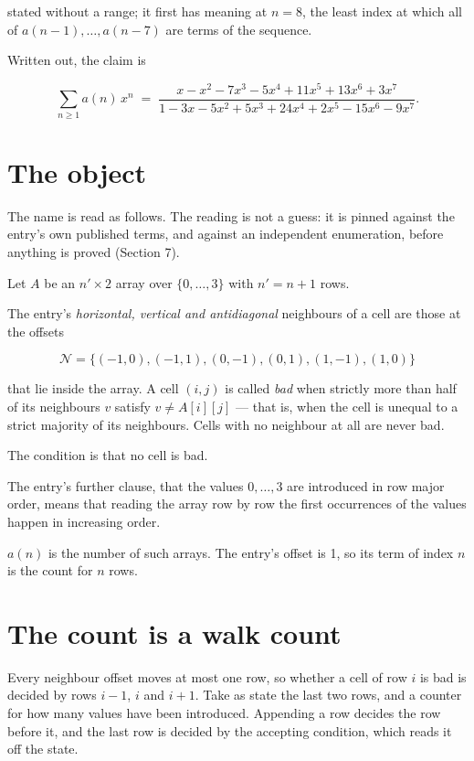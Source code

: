 \documentclass[11pt]{article}
\theoremstyle{definition}
\begin{document}
stated without a range; it first has meaning at $n = 8$, the least index at which all of $a(n-1),\dots,a(n-7)$ are terms of the sequence.

Written out, the claim is

\[\sum_{n \ge 1} a(n)\,x^n \;=\; \frac{x - x^{2} - 7x^{3} - 5x^{4} + 11x^{5} + 13x^{6} + 3x^{7}}{1 - 3x - 5x^{2} + 5x^{3} + 24x^{4} + 2x^{5} - 15x^{6} - 9x^{7}}.\]

\section{The object}

The name is read as follows. The reading is not a guess: it is pinned against the entry's own published terms, and against an independent enumeration, before anything is proved (Section 7).

Let $A$ be an $n' \times 2$ array over $\{0,\dots,3\}$ with $n' = n + 1$ rows.

The entry's {\itshape horizontal, vertical and antidiagonal} neighbours of a cell are those at the offsets

\[\mathcal{N} = \{(-1,0), (-1,1), (0,-1), (0,1), (1,-1), (1,0)\}\]

that lie inside the array. A cell $(i,j)$ is called {\itshape bad} when strictly more than half of its neighbours $v$ satisfy $v \ne A[i][j]$ --- that is, when the cell is unequal to a strict majority of its neighbours. Cells with no neighbour at all are never bad.

The condition is that no cell is bad.

The entry's further clause, that the values $0,\dots,3$ are introduced in row major order, means that reading the array row by row the first occurrences of the values happen in increasing order.

$a(n)$ is the number of such arrays. The entry's offset is 1, so its term of index $n$ is the count for $n$ rows.

\section{The count is a walk count}

Every neighbour offset moves at most one row, so whether a cell of row $i$ is bad is decided by rows $i-1$, $i$ and $i+1$. Take as state the last two rows, and a counter for how many values have been introduced. Appending a row decides the row before it, and the last row is decided by the accepting condition, which reads it off the state.
\end{document}
